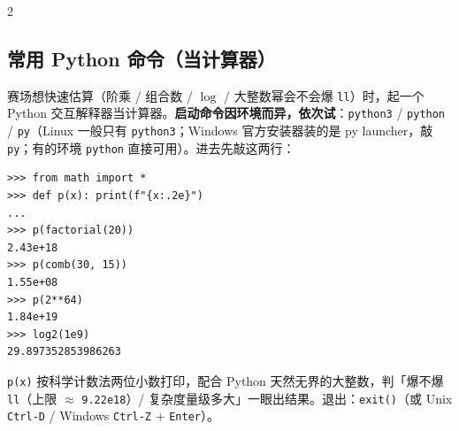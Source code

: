\begin{multicols*}{2}
	\subsection{常用 Python 命令（当计算器）}

	赛场想快速估算（阶乘 / 组合数 / $\log$ / 大整数幂会不会爆 \texttt{ll}）时，起一个 Python 交互解释器当计算器。\textbf{启动命令因环境而异，依次试}：\texttt{python3} / \texttt{python} / \texttt{py}（Linux 一般只有 \texttt{python3}；Windows 官方安装器装的是 py launcher，敲 \texttt{py}；有的环境 \texttt{python} 直接可用）。进去先敲这两行：

	\begin{verbatim}
>>> from math import *
>>> def p(x): print(f"{x:.2e}")
...
>>> p(factorial(20))
2.43e+18
>>> p(comb(30, 15))
1.55e+08
>>> p(2**64)
1.84e+19
>>> log2(1e9)
29.897352853986263
	\end{verbatim}

	\texttt{p(x)} 按科学计数法两位小数打印，配合 Python 天然无界的大整数，判「爆不爆 \texttt{ll}（上限 $\approx$ \texttt{9.22e18}）/ 复杂度量级多大」一眼出结果。退出：\texttt{exit()}（或 Unix \texttt{Ctrl-D} / Windows \texttt{Ctrl-Z} + \texttt{Enter}）。

\end{multicols*}

